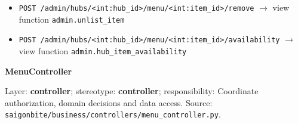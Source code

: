 \begin{itemize}
\item \texttt{POST /\allowbreak{}admin/\allowbreak{}hubs/\allowbreak{}\textless{}int:hub\_\allowbreak{}id\textgreater{}/\allowbreak{}menu/\allowbreak{}\textless{}int:item\_\allowbreak{}id\textgreater{}/\allowbreak{}remove} \ensuremath{\rightarrow} view function \texttt{admin.\allowbreak{}unlist\_\allowbreak{}item}

\item \texttt{POST /\allowbreak{}admin/\allowbreak{}hubs/\allowbreak{}\textless{}int:hub\_\allowbreak{}id\textgreater{}/\allowbreak{}menu/\allowbreak{}\textless{}int:item\_\allowbreak{}id\textgreater{}/\allowbreak{}availability} \ensuremath{\rightarrow} view function \texttt{admin.\allowbreak{}hub\_\allowbreak{}item\_\allowbreak{}availability}

\end{itemize}
\textbf{MenuController}

Layer: \textbf{controller}; stereotype: \textbf{\guillemotleft{}controller\guillemotright{}}; responsibility: Coordinate authorization, domain decisions and data access. Source: \texttt{saigonbite/\allowbreak{}business/\allowbreak{}controllers/\allowbreak{}menu\_\allowbreak{}controller.\allowbreak{}py}.

